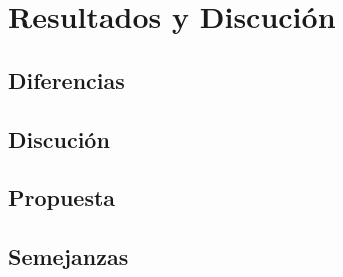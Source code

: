 \documentclass[journal]{IEEEtran}
\begin{document}
\section{Resultados y Discución}
\subsection{Diferencias}
\subsection{Discución}
\subsection{Propuesta}
\subsection{Semejanzas}






\balance






\end{document}
